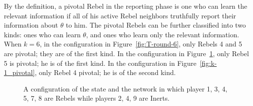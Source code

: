 \documentclass[12pt,letter]{article}
\theoremstyle{definition}
\theoremstyle{remark}
\theoremstyle{claim}
\begin{document}
By the definition, a pivotal Rebel in the reporting phase is one who can learn the relevant information if all of his active Rebel neighbors truthfully report their information about $\theta$ to him. The pivotal Rebels can be further classified into two kinds: ones who can learn $\theta$, and ones who learn only the relevant information. When $k=6$, in the configuration in Figure~\ref{fig:T-round-6}, only Rebels 4 and 5 are pivotal; they are of the first kind. In the configuration in Figure~\ref{fig:central_pivotal}, only Rebel 5 is pivotal; he is of the first kind. In the configuration in Figure~\ref{fig:k-1_pivotal}, only Rebel 4 pivotal; he is of the second kind.

%
%    
%    
%    
%        


\begin{figure}

\begin{center}
\end{center}
\caption{A configuration of the state and the network in which player 1, 3, 4, 5, 7, 8 are Rebels while players 2, 4, 9 are Inerts.}
\label{fig:central_pivotal}
\end{figure}
\end{document}

